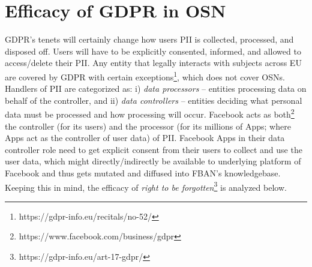\documentclass[runningheads]{llncs}
\begin{document}


\section{Efficacy of GDPR in OSN}
\label{sec:efficacy}
\noindent GDPR's tenets will certainly change how users PII is
collected, processed, and disposed off. Users will have to be
explicitly consented, informed, and allowed to access/delete their
PII. Any entity that legally interacts with subjects across EU are
covered by GDPR with certain
exceptions\footnote{https://gdpr-info.eu/recitals/no-52/}, which does
not cover OSNs.  Handlers of PII are categorized as: i) \textit{data
  processors} -- entities processing data on behalf of the controller,
and ii) \textit{data controllers} -- entities deciding what personal
data must be processed and how processing will occur. Facebook acts as
both\footnote{https://www.facebook.com/business/gdpr} the controller
(for its users) and the processor (for its millions of Apps; where
Apps act as the controller of user data) of PII. Facebook Apps in
their data controller role need to get explicit consent from their
users to collect and use the user data, which might
directly/indirectly be available to underlying platform of Facebook
and thus gets mutated and diffused into FBAN's knowledgebase. Keeping
this in mind, the efficacy of \textit{right to be
  forgotten}\footnote{https://gdpr-info.eu/art-17-gdpr/} is analyzed
below.
\end{document}
